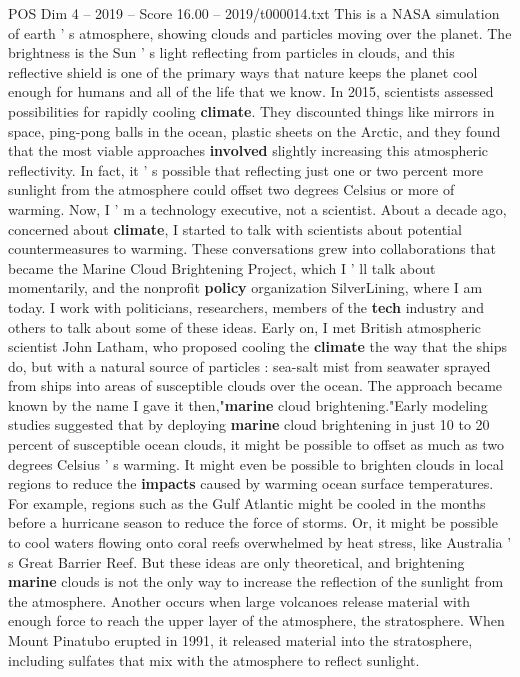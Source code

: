 \begin{textsample}{POS Dim 4 – 2019 – Score 16.00 – 2019/t000014.txt}
This is a NASA simulation of earth ' s atmosphere, showing clouds and particles moving over the planet.
The brightness is the Sun ' s light reflecting from particles in clouds, and this reflective shield is one of the primary ways that nature keeps the planet cool enough for humans and all of the life that we know.
In 2015, scientists assessed possibilities for rapidly cooling \textbf{climate}.
They discounted things like mirrors in space, ping-pong balls in the ocean, plastic sheets on the Arctic, and they found that the most viable approaches \textbf{involved} slightly increasing this atmospheric reflectivity.
In fact, it ' s possible that reflecting just one or two percent more sunlight from the atmosphere could offset two degrees Celsius or more of warming.
Now, I ' m a technology executive, not a scientist.
About a decade ago, concerned about \textbf{climate}, I started to talk with scientists about potential countermeasures to warming.
These conversations grew into collaborations that became the Marine Cloud Brightening Project, which I ' ll talk about momentarily, and the nonprofit \textbf{policy} organization SilverLining, where I am today.
I work with politicians, researchers, members of the \textbf{tech} industry and others to talk about some of these ideas.
Early on, I met British atmospheric scientist John Latham, who proposed cooling the \textbf{climate} the way that the ships do, but with a natural source of particles : sea-salt mist from seawater sprayed from ships into areas of susceptible clouds over the ocean.
The approach became known by the name I gave it then,"\textbf{marine} cloud brightening."Early modeling studies suggested that by deploying \textbf{marine} cloud brightening in just 10 to 20 percent of susceptible ocean clouds, it might be possible to offset as much as two degrees Celsius ' s warming.
It might even be possible to brighten clouds in local regions to reduce the \textbf{impacts} caused by warming ocean surface temperatures.
For example, regions such as the Gulf Atlantic might be cooled in the months before a hurricane season to reduce the force of storms.
Or, it might be possible to cool waters flowing onto coral reefs overwhelmed by heat stress, like Australia ' s Great Barrier Reef.
But these ideas are only theoretical, and brightening \textbf{marine} clouds is not the only way to increase the reflection of the sunlight from the atmosphere.
Another occurs when large volcanoes release material with enough force to reach the upper layer of the atmosphere, the stratosphere.
When Mount Pinatubo erupted in 1991, it released material into the stratosphere, including sulfates that mix with the atmosphere to reflect sunlight.

\end{textsample}
